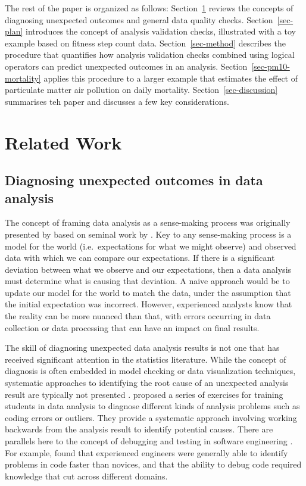\documentclass[
  12pt,
]{interact}
\begin{document}
The rest of the paper is organized as follows:
Section~\ref{sec-lit-review} reviews the concepts of diagnosing
unexpected outcomes and general data quality checks.
Section~\ref{sec-plan} introduces the concept of analysis validation
checks, illustrated with a toy example based on fitness step count data.
Section~\ref{sec-method} describes the procedure that quantifies how
analysis validation checks combined using logical operators can predict
unexpected outcomes in an analysis. Section~\ref{sec-pm10-mortality}
applies this procedure to a larger example that estimates the effect of
particulate matter air pollution on daily mortality.
Section~\ref{sec-discussion} summarises teh paper and discusses a few
key considerations.

\section{Related Work}\label{sec-lit-review}

\subsection{Diagnosing unexpected outcomes in data
analysis}\label{diagnosing-unexpected-outcomes-in-data-analysis}

The concept of framing data analysis as a sense-making process was
originally presented by \citep{grolemund_cognitive_2014} based on
seminal work by \citep{wild1999statistical}. Key to any sense-making
process is a model for the world (i.e.~expectations for what we might
observe) and observed data with which we can compare our expectations.
If there is a significant deviation between what we observe and our
expectations, then a data analysis must determine what is causing that
deviation. A naive approach would be to update our model for the world
to match the data, under the assumption that the initial expectation was
incorrect. However, experienced analysts know that the reality can be
more nuanced than that, with errors occurring in data collection or data
processing that can have an impact on final results.

The skill of diagnosing unexpected data analysis results is not one that
has received significant attention in the statistics literature. While
the concept of diagnosis is often embedded in model checking or data
visualization techniques, systematic approaches to identifying the root
cause of an unexpected analysis result are typically not presented
\citep{peng2022perspective}. \citep{peng_diagnosing_2021} proposed a
series of exercises for training students in data analysis to diagnose
different kinds of analysis problems such as coding errors or outliers.
They provide a systematic approach involving working backwards from the
analysis result to identify potential causes. There are parallels here
to the concept of debugging and testing in software engineering
\citep{donoghue2021teaching}. For example, \citep{li2019towards} found
that experienced engineers were generally able to identify problems in
code faster than novices, and that the ability to debug code required
knowledge that cut across different domains.
\end{document}
